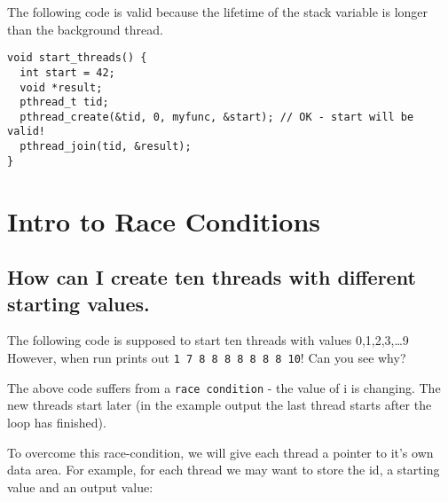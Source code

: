 The following code is valid because the lifetime of the stack variable
is longer than the background thread.

\begin{verbatim}
void start_threads() {
  int start = 42;
  void *result;
  pthread_t tid;
  pthread_create(&tid, 0, myfunc, &start); // OK - start will be valid!
  pthread_join(tid, &result);
}
\end{verbatim}

\section{Intro to Race Conditions}\label{intro-to-race-conditions}

\subsection{How can I create ten threads with different starting
values.}\label{how-can-i-create-ten-threads-with-different-starting-values.}

The following code is supposed to start ten threads with values
0,1,2,3,\ldots{}9 However, when run prints out
\texttt{1\ 7\ 8\ 8\ 8\ 8\ 8\ 8\ 8\ 10}! Can you see why?

\begin{Shaded}
\end{Shaded}

The above code suffers from a \texttt{race\ condition} - the value of i
is changing. The new threads start later (in the example output the last
thread starts after the loop has finished).

To overcome this race-condition, we will give each thread a pointer to
it's own data area. For example, for each thread we may want to store
the id, a starting value and an output value:

